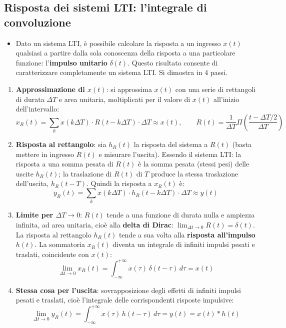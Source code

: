 \documentclass[12pt, a4paper]{article}
\begin{document}
\subsection{Risposta dei sistemi LTI: l'integrale di convoluzione}
\begin{itemize}
    \item Dato un sistema LTI, è possibile calcolare la risposta a un ingresso $x(t)$ qualsiasi a partire dalla sola conoscenza della risposta a una particolare funzione: l'\textbf{impulso unitario} $\delta(t)$. Questo risultato consente di caratterizzare completamente un sistema LTI. Si dimostra in 4 passi.
\end{itemize}

\begin{enumerate}
    \item \textbf{Approssimazione di $x(t)$}: si approssima $x(t)$ con una serie di rettangoli di durata $\Delta T$ e area unitaria, moltiplicati per il valore di $x(t)$ all'inizio dell'intervallo:
    $$x_R(t) = \sum_k x(k\Delta T)\cdot R(t-k\Delta T)\cdot \Delta T \approx x(t), \qquad R(t) = \frac{1}{\Delta T}\Pi\!\left(\frac{t-\Delta T/2}{\Delta T}\right)$$
    \item \textbf{Risposta al rettangolo}: sia $h_R(t)$ la risposta del sistema a $R(t)$ (basta mettere in ingresso $R(t)$ e misurare l'uscita). Essendo il sistema LTI: la risposta a una somma pesata di $R(t)$ è la somma pesata (stessi pesi) delle uscite $h_R(t)$; la traslazione di $R(t)$ di $T$ produce la stessa traslazione dell'uscita, $h_R(t-T)$. Quindi la risposta a $x_R(t)$ è:
    $$y_R(t) = \sum_k x(k\Delta T)\cdot h_R(t-k\Delta T)\cdot \Delta T \approx y(t)$$
    \item \textbf{Limite per $\Delta T\to 0$}: $R(t)$ tende a una funzione di durata nulla e ampiezza infinita, ad area unitaria, cioè alla \textbf{delta di Dirac}: $\lim_{\Delta t\to 0} R(t) = \delta(t)$. La risposta al rettangolo $h_R(t)$ tende a sua volta alla \textbf{risposta all'impulso} $h(t)$. La sommatoria $x_R(t)$ diventa un integrale di infiniti impulsi pesati e traslati, coincidente con $x(t)$:
    $$\lim_{\Delta t \to 0} x_R(t) = \int_{-\infty}^{+\infty} x(\tau)\,\delta(t-\tau)\,d\tau = x(t)$$
    \item \textbf{Stessa cosa per l'uscita}: sovrapposizione degli effetti di infiniti impulsi pesati e traslati, cioè l'integrale delle corrispondenti risposte impulsive:
    $$\lim_{\Delta t \to 0} y_R(t) = \int_{-\infty}^{+\infty} x(\tau)\,h(t-\tau)\,d\tau = y(t) = x(t) * h(t)$$
\end{enumerate}
\end{document}
